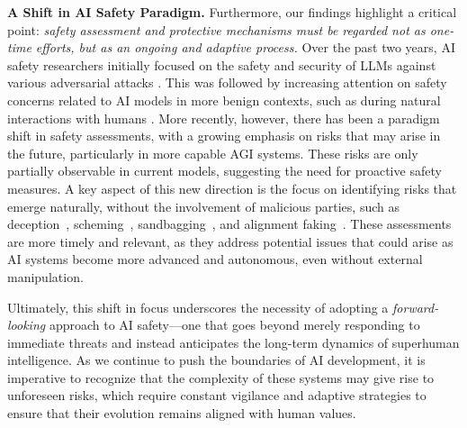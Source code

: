 \noindent\textbf{A Shift in AI Safety Paradigm.} Furthermore, our findings highlight a critical point: \emph{safety assessment and protective mechanisms must be regarded not as one-time efforts, but as an ongoing and adaptive process.}
Over the past two years, AI safety researchers initially focused on the safety and security of LLMs against various adversarial attacks \cite{zou2023universal, chao2023jailbreaking}. This was followed by increasing attention on safety concerns related to AI models in more benign contexts, such as during natural interactions with humans \cite{xu2023earth, zeng2024johnny}. More recently, however, there has been a paradigm shift in safety assessments, with a growing emphasis on risks that may arise in the future, particularly in more capable AGI systems. These risks are only partially observable in current models, suggesting the need for proactive safety measures.
A key aspect of this new direction is the focus on identifying risks that emerge naturally, without the involvement of malicious parties, such as deception~\citep{scheurer2024large, park2024ai, su2024ai}, scheming~\citep{meinke2024frontier, balesni2024towards}, sandbagging~\citep{van2024ai}, and alignment faking~\citep{greenblatt2024alignment, wang2023fake, carlsmith2023scheming}. These assessments are more timely and relevant, as they address potential issues that could arise as AI systems become more advanced and autonomous, even without external manipulation. 

Ultimately, this shift in focus underscores the necessity of adopting a \emph{forward-looking} approach to AI safety---one that goes beyond merely responding to immediate threats and instead anticipates the long-term dynamics of superhuman intelligence. As we continue to push the boundaries of AI development, it is imperative to recognize that the complexity of these systems may give rise to unforeseen risks, which require constant vigilance and adaptive strategies to ensure that their evolution remains aligned with human values.















